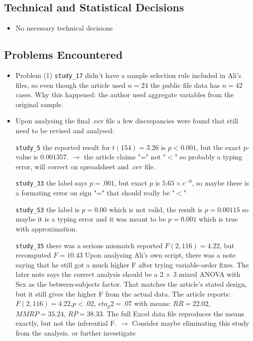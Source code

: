 \documentclass[11pt,a4paper]{article}
\begin{document}
\subsection{Technical and Statistical Decisions}

\begin{itemize}
    \item No necessary technical decisions

\end{itemize}

\subsection{Problems Encountered}

\begin{itemize}
    \item Problem (1) \texttt{study_17} didn't have a sample selection rule included in Ali's files, so even though the article used $n = 24$ the public file data has $n = 42$ cases. Why this happened: the author used aggregate variables from the original sample. 
    \item Upon analysing the final .csv file a few discrepancies were found that still need to be revised and analysed:
    
\texttt{study_5} the reported result for $t(154) = 3.26$ is $p<0.001$, but the exact p-value is $0.001357$. $\rightarrow$ the article claims "=" not "$<$" so probably a typing error, will correct on spreadsheet and .csv file.

\texttt{study_33} the label says $p=.001$, but exact $p$ is $5.65 \times e^{-9}$, so maybe there is a formating error on sign "=" that should really be "$<$" 

\texttt{study_53} the label is $p = 0.00$ which is not valid, the result is $p = 0.00115$ so maybe it is a typing error and it was meant to be $p = 0.001$ which is true with approximation. 

\texttt{study_35} there was a serious mismatch reported $F(2,116)=4.22$, but recomputed $F=10.43$
Upon analysing Ali's own script, there was a note saying that he still got a much higher F after trying variable-order fixes. The later note says the correct analysis should be a 2 × 3 mixed ANOVA with Sex as the between-subjects factor. That matches the article’s stated design, but it still gives the higher F from the actual data. The article reports: $F(2,116)=4.22$,$ p<.02$, $eta_p2=.07$ with means: $RR = 22.02$, $MMRP = 35.24$, $RP = 38.33$. The full Excel data file reproduces the means exactly, but not the inferential F. $\rightarrow$ Consider maybe eliminating this study from the analysis, or further investigate


\end{itemize}
\end{document}
